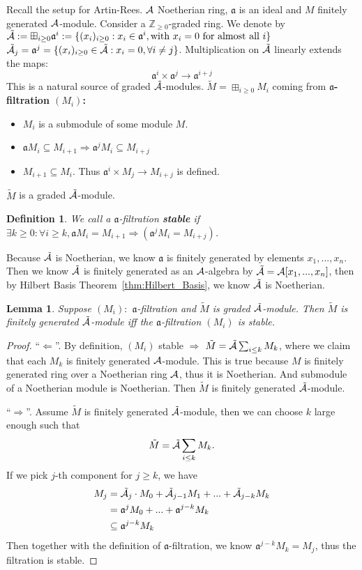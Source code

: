 \documentclass[11pt]{article}
\newtheorem{lemma}[thm]{Lemma}
\newtheorem{dfn}[thm]{Definition}
\newcommand{\intg}{\mathbb Z}
\newcommand{\sca}{{\mathfrak a}}
\newcommand{\cala}{{\cal A}}
\newcommand{\Lrta}{\Longrightarrow}
\newcommand{\lrta}{\longrightarrow}
\newcommand{\Llta}{\Longleftarrow}
\begin{document}
Recall the setup for Artin-Rees. $\cala$ Noetherian ring, $\sca$ is an ideal and $M$ finitely generated $\cala$-module. Consider a $\intg_{\geq 0}$-graded ring. We denote by $\tilde{\cala}:=\boxplus_{i\geq 0}\sca^i:=\{(x_i)_{i\geq 0}:x_i\in \sca^i, \text{with }x_i=0 \text{ for almost all }i\}$ 
$\tilde{\cala}_j=\sca^j=\{(x_i)_{i\geq 0}\in \tilde{\cala}: x_i=0, \forall i\neq j\}$. Multiplication on $\tilde{\cala}$ linearly extends the maps:
$$
\sca^i\times \sca^j\lrta \sca^{i+j}
$$
This is a natural source of graded $\tilde{\cala}$-modules. $\tilde{M}=\boxplus_{i\geq 0} M_i$ coming from  \textbf{$\sca$-filtration $(M_i)$:}
\begin{itemize}
\item $M_i$ is a submodule of some module $M$.
\item $\sca M_i\subseteq M_{i+1}\Lrta\sca^j M_i\subseteq M_{i+j}$
\item $M_{i+1}\subseteq M_i$. Thus $\sca^i\times M_j\lrta M_{i+j}$ is defined. 
\end{itemize}
$\tilde{M}$ is a graded $\tilde{\cala}$-module.
\begin{dfn}
We call a $\sca$-filtration \textbf{stable} if $\exists k\geq 0:\forall i\geq k,\sca M_i=M_{i+1}\Lrta(\sca^j M_i=M_{i+j})$.
\end{dfn}
Because $\tilde{\cala}$ is Noetherian, we know $\sca$ is finitely generated by elements $x_1,...,x_n$. Then we know $\tilde{\cala}$ is finitely generated as an $\cala$-algebra by $\tilde{\cala}=\cala[x_1,...,x_n]$, then by Hilbert Basis Theorem~\ref{thm:Hilbert_Basis}, we know $\tilde{\cala}$ is Noetherian.
\begin{lemma}
Suppose $(M_i):$ $\sca$-filtration and $\tilde{M}$ is graded $\tilde{\cala}$-module. Then $\tilde{M}$ is finitely generated $\tilde{\cala}$-module iff the $\sca$-filtration $(M_i)$ is stable.
\end{lemma}
\begin{proof}
``$\Llta$''. By definition, $(M_i)$ stable $\Lrta$ $\tilde{M}=\tilde{\cala}\sum_{i\leq k}M_k$, where we claim that each $M_k$ is finitely generated $\cala$-module. This is true because $M$ is finitely generated ring over a Noetherian ring $\cala$, thus it is Noetherian. And submodule of a Noetherian module is Noetherian. Then $\tilde{M}$ is finitely generated $\tilde{\cala}$-module.

``$\Lrta$''. Assume $\tilde{M}$ is finitely generated $\tilde{\cala}$-module, then we can choose $k$ large enough such that 
$$
\tilde{M}=\tilde{\cala}\sum_{i\leq k} M_k.
$$
If we pick $j$-th component for $j\geq k$, we have 
$$
\begin{aligned}
M_j&=\tilde{\cala}_j\cdot M_0+\tilde{\cala}_{j-1}M_1+...+\tilde{\cala}_{j-k}M_k\\
& = \sca^j M_0+...+\sca^{j-k}M_k\\
&\subseteq \sca^{j-k}M_k
\end{aligned}
$$
Then together with the definition of $\sca$-filtration, we know $\sca^{j-k}M_k=M_j$, thus the filtration is stable.
\end{proof}
\end{document}
